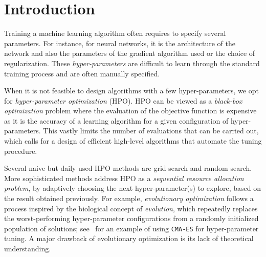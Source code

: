 \section{Introduction}\label{sec:dttts.intro}

Training a machine learning algorithm often requires to specify several parameters. For instance, for neural networks, it is the architecture of the network and also the parameters of the gradient algorithm used or the choice of regularization. These \emph{hyper-parameters} are difficult to learn through the standard training process and are often manually specified.

When it is not feasible to design algorithms with a few hyper-parameters, we opt for \emph{hyper-parameter optimization} (HPO).  HPO can be viewed as a \emph{black-box optimization} problem where the evaluation of the objective function is expensive as it is the accuracy of a learning algorithm for a given configuration of hyper-parameters. %
This vastly limits the number of evaluations that can be carried out, which calls for a design of efficient high-level algorithms that automate the tuning procedure.

Several naive but daily used HPO methods are  grid search and random search. More sophisticated methods address HPO as a \emph{sequential resource allocation problem}, by adaptively choosing the next hyper-parameter(s) to explore, based on the result obtained previously. For example, \emph{evolutionary optimization} follows a process inspired by the biological concept of \emph{evolution}, which repeatedly replaces the worst-performing hyper-parameter configurations from a randomly initialized population of solutions; see~\citet{loshchilov2016cmaes} for an example of using \texttt{CMA-ES} for hyper-parameter tuning. A major drawback of evolutionary optimization is its lack of theoretical understanding.

